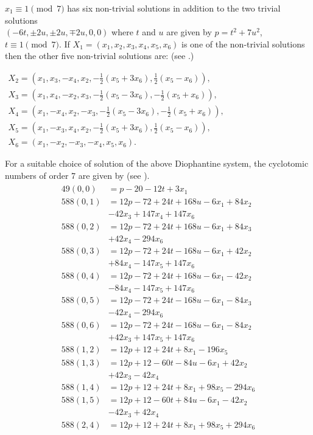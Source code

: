 \documentclass[a4paper,12pt]{article}
\def\vpmod{\!\!\!\pmod}
\begin{document}
$x_{1}\equiv 1\vpmod 7 $ has six non-trivial solutions in addition to the two trivial solutions\\ $(-6t, \pm2u,\pm2u, \mp2u, 0, 0)$
where $t$ and $u$ are given by $p=t^2+7u^2$, $t\equiv 1\vpmod7$.
If $X_{1}=(x_{1},x_{2},x_{3}, x_{4}, x_{5}, x_{6})$ is one of the non-trivial solutions then the other five non-trivial solutions are: (see \cite{10}.)\\
\begin{center}
$\begin{aligned}
	X_{2}=(x_{1}, x_{3},-x_{4}, x_{2},-\frac{1}{2}(x_{5}+3x_{6}),\frac{1}{2}(x_{5}-x_{6})),\\
	X_{3}=(x_{1}, x_{4},-x_{2}, x_{3},-\frac{1}{2}(x_{5}-3x_{6}),-\frac{1}{2}(x_{5}+x_{6})),\\
	X_{4}=(x_{1}, -x_{4},x_{2}, -x_{3},-\frac{1}{2}(x_{5}-3x_{6}),-\frac{1}{2}(x_{5}+x_{6})),\\
	X_{5}=(x_{1}, -x_{3},x_{4}, x_{2},-\frac{1}{2}(x_{5}+3x_{6}),\frac{1}{2}(x_{5}-x_{6})),\\
	X_{6}=(x_{1},-x_{2},-x_{3}, -x_{4}, x_{5}, x_{6}).
\end{aligned}$
\end{center}
For a suitable choice of solution of the above Diophantine system, the cyclotomic numbers of order 7 are given by (see \cite{11}).\\
\begin{eqnarray}\label{eq:8}
\begin{aligned}
49(0,0)&=p-20-12t+3x_{1}\\
588(0,1)&=12p-72+24t+168u-6x_{1}+84x_{2}\\
& -42x_{3}+147x_{4}+147x_{6}\\
588(0,2)&=12p-72+24t+168u-6x_{1}+84x_{3}\\
&+42x_{4}-294x_{6}\\
588(0,3)&=12p-72+24t-168u-6x_{1}+42x_{2}\\
&+84x_{4}-147x_{5}+147x_{6}\\
588(0,4)&=12p-72+24t+168u-6x_{1}-42x_{2}\\
&-84x_{4}-147x_{5}+147x_{6}\\
588(0,5)&=12p-72+24t-168u-6x_{1}-84x_{3}\\
&-42x_{4}-294x_{6}\\
588(0,6)&=12p-72+24t-168u-6x_{1}-84x_{2}\\
&+42x_{3}+147x_{5}+147x_{6}\\
588(1,2)&=12p+12+24t+8x_{1}-196x_{5}\\
588(1,3)&=12p+12-60t-84u-6x_{1}+42x_{2}\\
&+42x_{3}-42x_{4}\\
588(1,4)&=12p+12+24t+8x_{1}+98x_{5}-294x_{6}\\
588(1,5)&=12p+12-60t+84u-6x_{1}-42x_{2}\\
&-42x_{3}+42x_{4}\\
588(2,4)&=12p+12+24t+8x_{1}+98x_{5}+294x_{6}
\end{aligned}
\end{eqnarray}
\end{document}
